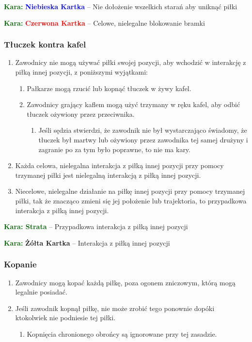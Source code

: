 \documentclass[11pt,a4paper]{article}
\newcommand\redcard[1]{\bgroup\textcolor{darkgreen}{\textbf{Kara: }}\bgroup\textcolor{red}{\textbf{Czerwona Kartka}} -- #1}
\newcommand\yellowcard[1]{\bgroup\textcolor{darkgreen}{\textbf{Kara: }}\bgroup\textcolor{darkyellow}{\textbf{Żółta Kartka}} -- #1}
\newcommand\bluecard[1]{\bgroup\textcolor{darkgreen}{\textbf{Kara: }}\bgroup\textcolor{blue}{\textbf{Niebieska Kartka}} -- #1}
\newcommand\penaltyd[2]{\bgroup\textcolor{darkgreen}{\textbf{Kara: #1}} -- #2}
\begin{document}
\bluecard{Nie dołożenie wszelkich starań aby uniknąć piłki}

\redcard{Celowe, nielegalne blokowanie bramki}

\subsubsection{Tłuczek kontra kafel}
\begin{enumerate}
  \item Zawodnicy nie mogą używać piłki swojej pozycji, aby wchodzić w interakcję z piłką innej pozycji, z poniższymi wyjątkami:
  \begin{enumerate}
    \item Pałkarze mogą rzucić lub kopnąć tłuczek w żywy kafel.
    \item Zawodnicy grający kaflem mogą użyć trzymany w ręku kafel, aby odbić tłuczek ożywiony przez przeciwnika.
    \begin{enumerate}
      \item Jeśli sędzia stwierdzi, że zawodnik nie był wystarczająco świadomy, że tłuczek był martwy lub ożywiony przez zawodnika tej samej drużyny i zagranie po za tym było poprawne, to nie ma kary.
    \end{enumerate}
  \end{enumerate}
  \item Każda celowa, nielegalna interakcja z piłką innej pozycji przy pomocy trzymanej piłki jest nielegalną interakcją z piłką innej pozycji.
  \item Niecelowe, nielegalne działanie na piłkę innej pozycji przy pomocy trzymanej piłki, tak że znacząco zmieni się jej położenie lub trajektoria, to przypadkowa interakcja z piłką innej pozycji.
\end{enumerate}

\penaltyd{Strata}{Przypadkowa interakcja z piłką innej pozycji}

\yellowcard{Interakcja z piłką innej pozycji}

\subsubsection{Kopanie}
\begin{enumerate}
  \item Zawodnicy mogą kopać każdą piłkę, poza ogonem zniczowym, którą mogą legalnie posiadać.
  \item Jeśli zawodnik kopnął piłkę, nie może zrobić tego ponownie dopóki ktokolwiek nie podniesie tej piłki.
  \begin{enumerate}
    \item Kopnięcia chronionego obrońcy są ignorowane przy tej zasadzie.
  \end{enumerate}
\end{enumerate}
\end{document}
